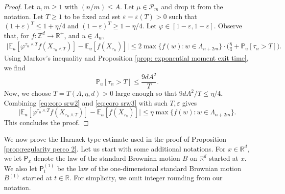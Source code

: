 \documentclass[11pt,a4paper]{article}
\numberwithin{equation}{section}
\theoremstyle{plain}
\theoremstyle{definition}
\begin{document}
\begin{proof} 
Let $n,m\geq 1$ with $(n/m)\leq A$. Let $\mu \in \mathcal P_m$ and drop it from the notation.
Let $T\geq 1$ to be fixed and set $\varepsilon=\varepsilon(T)>0$ such that $(1+\varepsilon)^T\leq 1+\eta/4$ and $(1-\varepsilon)^T\geq 1-\eta/4$. Let $\varphi\in [1-\varepsilon,1+\varepsilon]$. Observe that, for $f:\mathbb Z^d\rightarrow \mathbb R^+$, and $u\in \Lambda_n$,
\begin{multline}\label{eq:coro srw2}
	\Big|\mathbb E_u[\varphi^{\tau_n\wedge T}f(X_{\tau_n\wedge T})]-\mathbb E_u[f(X_{\tau_n})]\Big|\leq 2\max\{f(w):w\in \Lambda_{n+2m}\} \cdot\Big(\frac{\eta}{4}+\mathbb P_u[\tau_n>T]\Big).
\end{multline}
Using Markov's inequality and Proposition \ref{prop: exponential moment exit time}, we find
\begin{equation}\label{eq:coro srw3}
	\mathbb P_u[\tau_n>T]\leq \frac{9dA^2}{T}.
\end{equation}
Now, we choose $T=T(A,\eta,d)>0$ large enough so that $9dA^2/T\leq \eta/4$. Combining \eqref{eq:coro srw2} and \eqref{eq:coro srw3} with such $T,\varepsilon$ gives
\begin{equation}\label{eq:coro srw4}
	\Big|\mathbb E_u[\varphi^{\tau_n\wedge T}f(X_{\tau_n\wedge T})]-\mathbb E_u[f(X_{\tau_n})]\Big|\leq \eta\max\{f(w):w\in \Lambda_{n+2m}\}.
\end{equation}	
This concludes the proof.
\end{proof}



We now prove the Harnack-type estimate used in the proof of Proposition \ref{prop:regularity perco 2}. Let us start with some additional notations. For $x\in \mathbb R^d$, we let $\mathsf{P}_x$ denote the law of the standard Brownian motion $B$ on $\mathbb R^d$ started at $x$. We also let $\mathsf P_t^{(1)}$ be the law of the one-dimensional standard Brownian motion $B^{(1)}$ started at $t\in \mathbb R$. For simplicity, we omit integer rounding from our notation.
\end{document}
